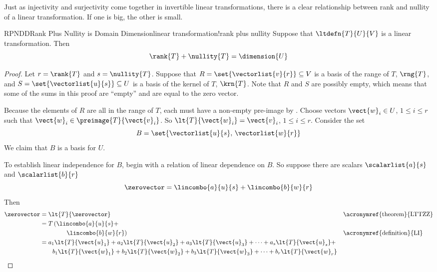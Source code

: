 %
Just as injectivity and surjectivity come together in invertible linear transformations, there is a clear relationship between rank and nullity of a linear transformation.  If one is big, the other is small.
%
\begin{theorem}{RPNDD}{Rank Plus Nullity is Domain Dimension}{linear transformation!rank plus nullity}
Suppose that $\ltdefn{T}{U}{V}$ is a linear transformation.  Then
%
\begin{equation*}
\rank{T}+\nullity{T}=\dimension{U}
\end{equation*}
%
\end{theorem}
%
\begin{proof}
Let $r=\rank{T}$ and $s=\nullity{T}$.  Suppose that $R=\set{\vectorlist{v}{r}}\subseteq V$ is a basis of the range of $T$, $\rng{T}$, and $S=\set{\vectorlist{u}{s}}\subseteq U$ is a basis of the kernel of $T$, $\krn{T}$.  Note that $R$ and $S$ are possibly empty, which means that some of the sums in this proof are ``empty'' and are equal to the zero vector.\par
%
Because the elements of $R$ are all in the range of $T$, each must have a non-empty pre-image by .  Choose vectors $\vect{w}_i\in U$, $1\leq i\leq r$ such that $\vect{w}_i\in\preimage{T}{\vect{v}_i}$.  So $\lt{T}{\vect{w}_i}=\vect{v}_i$, $1\leq i\leq r$.  Consider the set
%
\begin{equation*}
B=\set{\vectorlist{u}{s},\,\vectorlist{w}{r}}
\end{equation*}
%
We claim that $B$ is a basis for $U$.\par
%
To establish linear independence for $B$, begin with a relation of linear dependence on $B$.  So suppose there are scalars $\scalarlist{a}{s}$ and $\scalarlist{b}{r}$
%
\begin{equation*}
\zerovector=\lincombo{a}{u}{s}+\lincombo{b}{w}{r}
\end{equation*}
%
Then
%
\begin{align*}
\zerovector&=\lt{T}{\zerovector}&&\text{\acronymref{theorem}{LTTZZ}}\\
%
&=T\left(\lincombo{a}{u}{s}+\right.\\
&\quad\quad\quad\quad\left.\lincombo{b}{w}{r}\right)&&\text{\acronymref{definition}{LI}}\\
%
&=a_1\lt{T}{\vect{u}_1}+a_2\lt{T}{\vect{u}_2}+a_3\lt{T}{\vect{u}_3}+\cdots+a_s\lt{T}{\vect{u}_s}+\\
&\quad\quad b_1\lt{T}{\vect{w}_1}+b_2\lt{T}{\vect{w}_2}+b_3\lt{T}{\vect{w}_3}+\cdots+b_r\lt{T}{\vect{w}_r}

\end{align*}
\end{proof}
